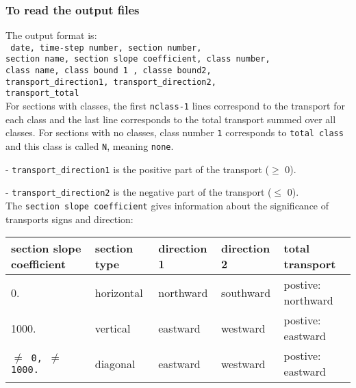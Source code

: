 \documentclass[../main/NEMO_manual]{subfiles}
\begin{document}
\subsubsection{To read the output files}

The output format is: \\
{
  \texttt{
    date, time-step number, section number,                \\
    section name, section slope coefficient, class number, \\
    class name, class bound 1 , classe bound2,             \\
    transport\_direction1, transport\_direction2,          \\
    transport\_total}
}                                     \\

For sections with classes, the first \texttt{nclass-1} lines correspond to the transport for each class and
the last line corresponds to the total transport summed over all classes.
For sections with no classes, class number \texttt{1} corresponds to \texttt{total class} and
this class is called \texttt{N}, meaning \texttt{none}.

- \texttt{transport\_direction1} is the positive part of the transport ($\geq$ 0).

- \texttt{transport\_direction2} is the negative part of the transport ($\leq$ 0). \\

\noindent The \texttt{section slope coefficient} gives information about the significance of transports signs and
direction: \\

\begin{table}
  \begin{tabular}{|l|l|l|l|l|}
    \hline
    section slope coefficient      & section type & direction 1 & direction 2 & total transport    \\
    \hline
    0.                             & horizontal	 & northward	& southward   & postive: northward    \\
    \hline
    1000.                          & vertical     & eastward    & westward    & postive: eastward		\\
    \hline
    \texttt{$\neq$ 0, $\neq$ 1000.} & diagonal     & eastward    & westward	  & postive: eastward		\\
    \hline
  \end{tabular}
\end{table}
\end{document}
